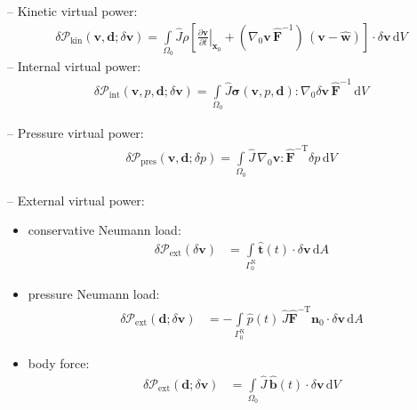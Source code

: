 \documentclass[a4paper,12pt]{report}
\newcommand{\bs}[1]{\boldsymbol{#1}}
\newcommand{\Om}{\mathit{\Omega}}
\newcommand{\Gm}{\mathit{\Gamma}}
\begin{document}
-- Kinetic virtual power:
\begin{equation}
\begin{aligned}
\delta \mathcal{P}_{\mathrm{kin}}(\bs{v},\bs{d};\delta\bs{v}) = \int\limits_{\Om_0} \widehat{J} \rho\left[\left.\frac{\partial\bs{v}}{\partial t}\right|_{\bs{x}_{0}} + (\nabla_{0}\bs{v}\,\widehat{\bs{F}}^{-1})\,(\bs{v}-\widehat{\bs{w}})\right] \cdot \delta\bs{v} \,\mathrm{d}V
\end{aligned}
\end{equation}
-- Internal virtual power:
\begin{equation}
\begin{aligned}
\delta \mathcal{P}_{\mathrm{int}}(\bs{v},p,\bs{d};\delta\bs{v}) = 
\int\limits_{\Om_0} \widehat{J}\bs{\sigma}(\bs{v},p,\bs{d}) : \nabla_{0} \delta\bs{v}\,\widehat{\bs{F}}^{-1} \,\mathrm{d}V
\end{aligned}
\end{equation}

-- Pressure virtual power:
\begin{equation}
\begin{aligned}
\delta \mathcal{P}_{\mathrm{pres}}(\bs{v},\bs{d};\delta p) = 
\int\limits_{\Om_0} \widehat{J}\,\nabla_{0}\bs{v} : \widehat{\bs{F}}^{-\mathrm{T}}\delta p\,\mathrm{d}V
\end{aligned}
\end{equation}

-- External virtual power:\\
\begin{itemize}
\item conservative Neumann load:
\begin{equation}
\begin{aligned}
\delta \mathcal{P}_{\mathrm{ext}}(\delta\bs{v}) &= \int\limits_{\Gm_0^{\mathrm{N}}} \hat{\bs{t}}(t) \cdot \delta\bs{v} \,\mathrm{d}A
\end{aligned}
\end{equation}
\item pressure Neumann load:
\begin{equation}
\begin{aligned}
\delta \mathcal{P}_{\mathrm{ext}}(\bs{d};\delta\bs{v}) &= -\int\limits_{\Gm_0^{\mathrm{N}}} \hat{p}(t)\,\widehat{J}\widehat{\bs{F}}^{-\mathrm{T}}\bs{n}_{0} \cdot \delta\bs{v} \,\mathrm{d}A 
\end{aligned}
\end{equation}
\item body force:
\begin{equation}
\begin{aligned}
\delta \mathcal{P}_{\mathrm{ext}}(\bs{d};\delta\bs{v}) &= \int\limits_{\Om_0} \widehat{J}\,\hat{\bs{b}}(t) \cdot \delta\bs{v} \,\mathrm{d}V
\end{aligned}
\end{equation}
\end{itemize}
\end{document}
